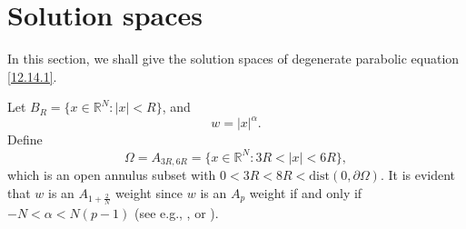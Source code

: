 \documentclass[11pt]{article}
\numberwithin{equation}{section}
\begin{document}
	
	
 \section{Solution spaces}\label{Section 2}

In this section, we shall give the solution spaces of degenerate parabolic equation \eqref{12.14.1}.


Let $B_R = \{x \in \mathbb{R}^N \colon |x| < R\}$, and
\begin{equation*}
w = |x|^\alpha.
\end{equation*}
Define
\begin{equation*}
\Omega = A_{3R, 6R} = \{x \in \mathbb{R}^N \colon 3R < |x| < 6R\},
\end{equation*}
which is an open annulus subset with $0 < 3R < 8R < \mathrm{dist}(0, \partial \Omega)$.
It is evident that $w$ is an $A_{1 + \frac{2}{N}}$ weight since $w$ is an $A_p$ weight if and only if $-N < \alpha < N(p - 1)$ (see e.g., \cite[p.10]{Heinonen}, or   \cite[chapter IV]{Garcia-Cuerva}).
\end{document}
